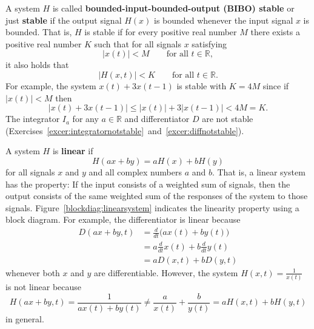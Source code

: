 \documentclass[11pt,a4paper]{book}
\theoremstyle{plain}
\numberwithin{equation}{section}
\newcommand{\reals}{{\mathbb R}}
\newcommand{\term}{\textbf}
\newcommand{\abs}[1]{\left\vert #1 \right\vert}
\begin{document}
A system $H$ is called \term{bounded-input-bounded-output (BIBO) stable} or just \term{stable} if the output signal $H(x)$ is bounded whenever the input signal $x$ is bounded.  That is, $H$ is stable if for every positive real number $M$ there exists a positive real number $K$ such that for all signals $x$ satisfying
\[
\abs{x(t)} < M \qquad \text{for all $t\in\reals$},
\] 
it also holds that
\[
\abs{H(x,t)} < K \qquad \text{for all $t\in\reals$}.
\]
For example, the system $x(t) + 3 x(t-1)$ is stable with $K = 4M$ since if $\abs{x(t)} < M$ then 
\[
\abs{x(t) + 3 x(t-1)} \leq \abs{x(t)} + 3 \abs{x(t-1)} < 4 M = K.
\]
The integrator $I_a$ for any $a \in \reals$ and differentiator $D$ are not stable (Exercises~\ref{excer:integratornotstable}~and~\ref{excer:diffnotstable}).

A system $H$ is \term{linear} if
\[
H( ax + by) = a H(x) + b H(y)
\]
for all signals $x$ and $y$ and all complex numbers $a$ and $b$.  That is, a linear system has the property: If the input consists of a weighted sum of signals, then the output consists of the same weighted sum of the responses of the system to those signals.  Figure~\ref{blockdiag:linearsystem} indicates the linearity property using a block diagram.  For example, the differentiator is linear because
\begin{align*}
D(ax + by,t) &= \frac{d}{dt}\big(ax(t) + by(t)\big) \\
&= a\frac{d}{dt}x(t) + b\frac{d}{dt}y(t) \\
&= aD(x,t) + bD(y,t)
\end{align*}
whenever both $x$ and $y$ are differentiable.  
However, the system $H(x,t) = \frac{1}{x(t)}$ is not linear because
\[
H(ax + by,t) = \frac{1}{ax(t) + by(t)} \neq \frac{a}{x(t)} + \frac{b}{y(t)} = aH(x,t) + bH(y,t)
\]
in general.
\end{document}
